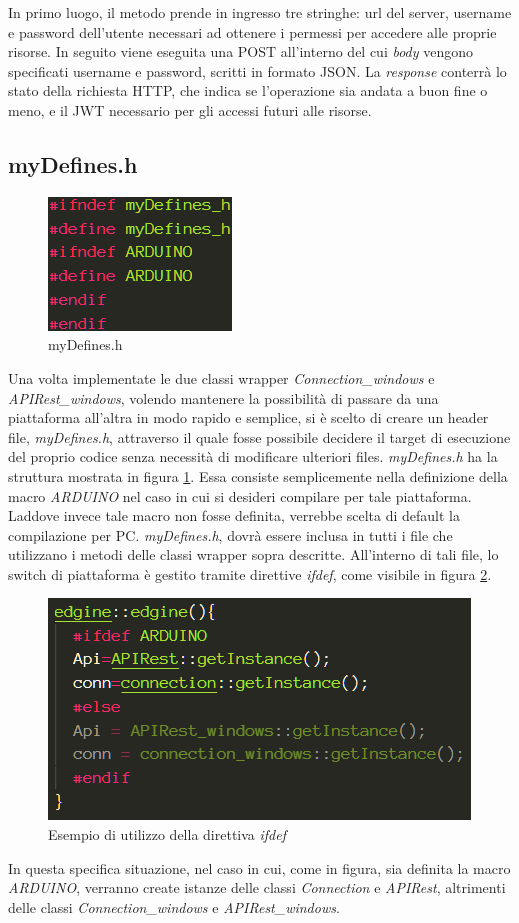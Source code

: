 In primo luogo, il metodo prende in ingresso tre stringhe: url del server, username e password dell'utente necessari ad ottenere i permessi per accedere alle proprie risorse. In seguito viene eseguita una POST all'interno del cui \textit{body} vengono specificati username e password, scritti in formato JSON. La \textit{response} conterrà lo stato della richiesta HTTP, che indica se l'operazione sia andata a buon fine o meno, e il JWT necessario per gli accessi futuri alle risorse.
\subsection{myDefines.h}
\begin{figure}
	\centering
	\includegraphics{pics/myDefines}
	\caption{myDefines.h}
	\label{myDefines}
\end{figure}
Una volta implementate le due classi wrapper \textit{Connection\_windows} e \textit{APIRest\_windows}, volendo mantenere la possibilità di passare da una piattaforma all'altra in modo rapido e semplice, si è scelto di creare un header file, \textit{myDefines.h}, attraverso il quale fosse possibile decidere il target di esecuzione del proprio codice senza necessità di modificare ulteriori files. \textit{myDefines.h} ha la struttura mostrata in figura \ref{myDefines}.
Essa consiste semplicemente nella definizione della macro \textit{ARDUINO} nel caso in cui si desideri compilare per tale piattaforma. Laddove invece tale macro non fosse definita, verrebbe scelta di default la compilazione per PC. \textit{myDefines.h}, dovrà essere inclusa in tutti i file che utilizzano i metodi delle classi wrapper sopra descritte. All'interno di tali file, lo switch di piattaforma è gestito tramite direttive \textit{ifdef}, come visibile in figura \ref{ifdef}.
\begin{figure}[H]
	\centering
	\includegraphics[width=0.66\linewidth]{pics/ifdef}
	\caption{Esempio di utilizzo della direttiva \textit{ifdef}}
	\label{ifdef}
\end{figure}
In questa specifica situazione, nel caso in cui, come in figura, sia definita la macro \textit{ARDUINO}, verranno create istanze delle classi \textit{Connection} e \textit{APIRest}, altrimenti delle classi \textit{Connection\_windows} e \textit{APIRest\_windows}.
